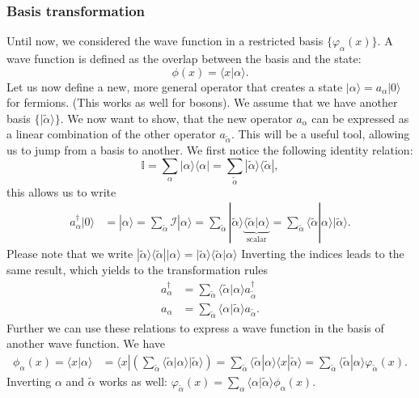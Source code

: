 \documentclass[../main.tex]{subfile}
\begin{document}
\subsubsection{Basis transformation}
Until now, we considered the wave function in a restricted basis $\{\varphi_{\alpha}(x)\}$. A wave function is defined as the overlap between the basis and the state:
\[
    \phi(x) = \langle x | \alpha \rangle.
\]
Let us now define a new, more general operator that creates a state $|\alpha\rangle = a_{\alpha}|0\rangle$ for fermions. (This works as well for bosons).
We assume that we have another basis $\{|\tilde{\alpha}\rangle\}$.
We now want to show, that the new operator $a_{\alpha}$ can be expressed as a linear combination of the other operator  $a_{\tilde{\alpha}}$. This will be a
useful tool, allowing us to jump from a basis to another. We first notice the following identity relation:
\[
    \mathbb{I} = \sum_{\alpha} | \alpha \rangle \langle \alpha| = \sum_{\tilde{\alpha}} | \tilde{\alpha} \rangle \langle \tilde{\alpha}|,
\]
this allows us to write 
\begin{align*}  
    a_{\alpha}^{\dagger}|0\rangle &= | \alpha \rangle =  \sum_{\tilde{\alpha}}\mathcal{I}|\alpha\rangle 
    =\sum_{\tilde{\alpha}}|\tilde{\alpha}\rangle\underbrace{\langle\tilde{\alpha}|\alpha\rangle}_{\text{scalar}} 
    = \sum_{\tilde{\alpha}}\langle\tilde{\alpha}|\alpha\rangle |\tilde{\alpha}\rangle.
\end{align*}
Please note that we write $|\tilde{\alpha}\rangle\langle\tilde{\alpha}||\alpha\rangle = |\tilde{\alpha}\rangle\langle\tilde{\alpha}|\alpha\rangle$
Inverting the indices leads to the same result, which yields to the transformation rules
\begin{align*}
    a_{\alpha}^{\dagger} &= \sum_{\tilde{\alpha}}\langle\tilde{\alpha}|\alpha\rangle a_{\tilde{\alpha}}^{\dagger}\\
    a_{\alpha} &= \sum_{\tilde{\alpha}}\langle\alpha|\tilde{\alpha}\rangle a_{\tilde{\alpha}}.
\end{align*}
Further we can use these relations to express a wave function in the basis of another wave function. We have
\begin{align*}
    \phi_{\alpha}(x) = \langle x|\alpha\rangle &= \langle x|\left(\sum_{\tilde{\alpha}} \langle \tilde{\alpha}|\alpha\rangle |\tilde{\alpha}\rangle\right) = \sum_{\tilde{\alpha}}  \langle \tilde{\alpha}|\alpha\rangle\langle x|\tilde{\alpha}\rangle
    = \sum_{\tilde{\alpha}} \langle \tilde{\alpha}|\alpha\rangle \varphi_{\tilde{\alpha}}(x).
\end{align*}
Inverting $\alpha$ and $\tilde{\alpha}$ works as well: $\varphi_{\tilde{\alpha}}(x) = \sum_{\alpha} \langle \alpha|\tilde{\alpha}\rangle \phi_{\alpha}(x)$.\\
\end{document}

